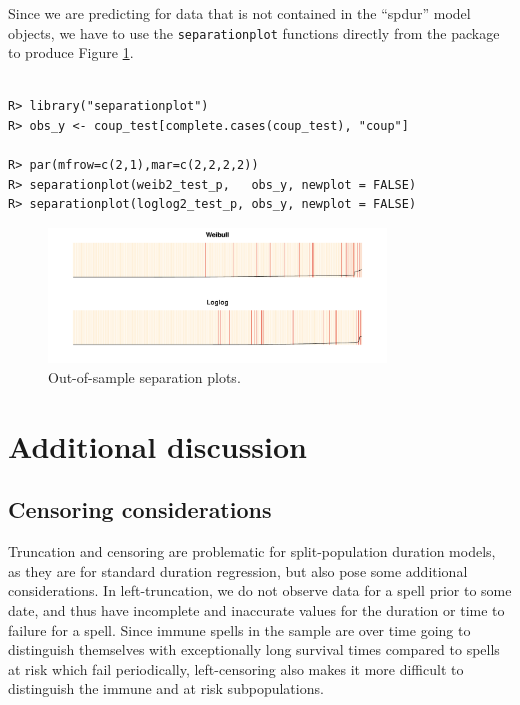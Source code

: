 \documentclass[12pt,onesided]{amsart}
\begin{document}
Since we are predicting for data that is not contained in the ``spdur''
model objects, we have to use the \texttt{separationplot} functions
directly from the package to produce Figure \ref{oos-sepplots}.

\begin{lstlisting}

R> library("separationplot")
R> obs_y <- coup_test[complete.cases(coup_test), "coup"]

R> par(mfrow=c(2,1),mar=c(2,2,2,2))
R> separationplot(weib2_test_p,   obs_y, newplot = FALSE)
R> separationplot(loglog2_test_p, obs_y, newplot = FALSE)

\end{lstlisting}

\begin{figure}
\begin{center}
\includegraphics[width=0.8\textwidth]{graphics/oos-sepplots.pdf}
\caption{Out-of-sample separation plots.}
\label{oos-sepplots}
\end{center}
\end{figure}

\section{Additional discussion}

\subsection{Censoring considerations}

Truncation and censoring are problematic for split-population duration
models, as they are for standard duration regression, but also pose some
additional considerations. In left-truncation, we do not observe data
for a spell prior to some date, and thus have incomplete and inaccurate
values for the duration or time to failure for a spell. Since immune
spells in the sample are over time going to distinguish themselves with
exceptionally long survival times compared to spells at risk which fail
periodically, left-censoring also makes it more difficult to distinguish
the immune and at risk subpopulations.
\end{document}
